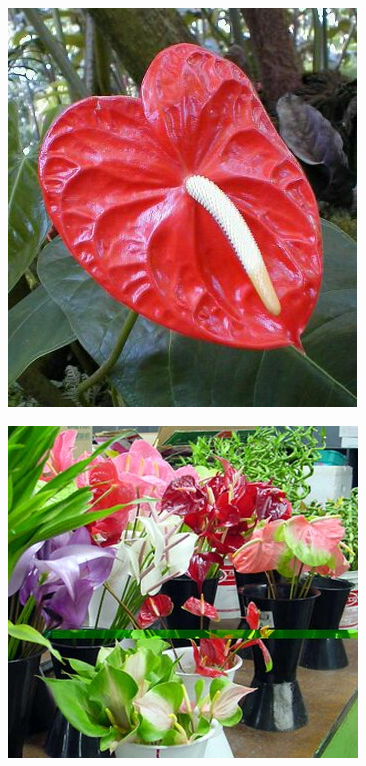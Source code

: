 \documentclass{article}
\begin{document}
\begin{center}
\includegraphics[width=0.9\textheight, angle=90]{../Anthurium2.jpg}
\end{center}
\newpage

\begin{center}
\includegraphics[width=0.9\textheight, angle=90]{../AnthuriumCF.jpg}
\end{center}
\newpage
\end{document}

